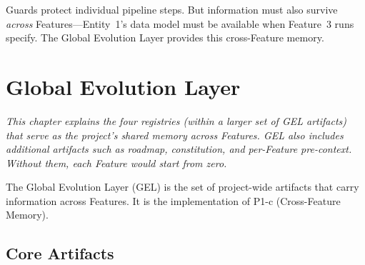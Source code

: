 \documentclass[11pt,a4paper,openright,twoside]{report}
\begin{document}
Guards protect individual pipeline steps. But information must also survive \emph{across} Features---Entity~1's data model must be available when Feature~3 runs specify. The Global Evolution Layer provides this cross-Feature memory.

\chapter{Global Evolution Layer}
\label{ch:gel}

\textit{This chapter explains the four registries (within a larger set of GEL artifacts) that serve as the project's shared memory across Features. GEL also includes additional artifacts such as roadmap, constitution, and per-Feature pre-context. Without them, each Feature would start from zero.}

The Global Evolution Layer (GEL) is the set of project-wide artifacts that carry information across Features. It is the implementation of P1-c (Cross-Feature Memory).

\section{Core Artifacts}
\end{document}
